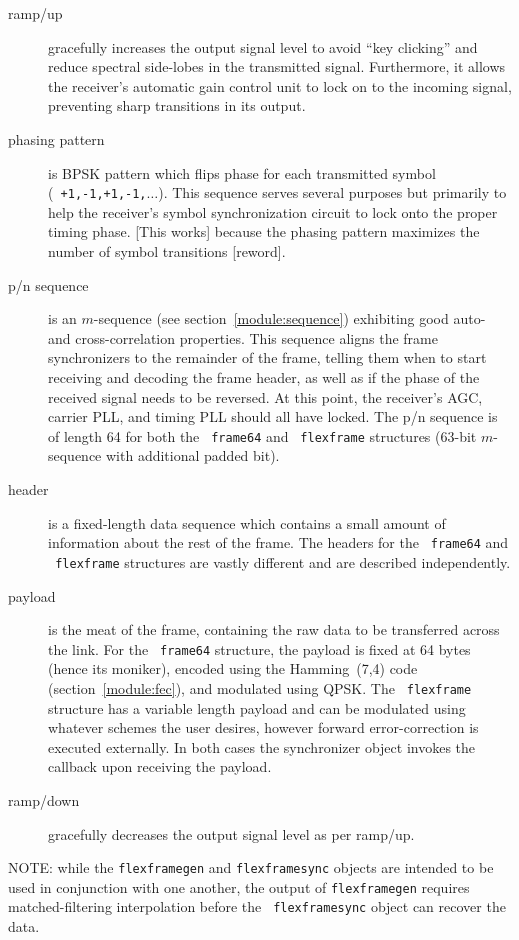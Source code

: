 \begin{description}
\item[{\sf ramp/up}]
    gracefully increases the output signal level to avoid ``key clicking'' and
    reduce spectral side-lobes in the transmitted signal.
    Furthermore, it allows the receiver's automatic gain control unit to
    lock on to the incoming signal, preventing sharp transitions in its
    output.
\item[{\sf phasing pattern}]
    is BPSK pattern which flips phase for each transmitted symbol
    ({\tt~+1,-1,+1,-1,$\ldots$}).
    This sequence serves several purposes but primarily to help the receiver's
    symbol synchronization circuit to lock onto the proper timing phase.
    [This works] because the phasing pattern maximizes the number of symbol
    transitions [reword].
\item[{\sf p/n sequence}]
    is an $m$-sequence (see section~\ref{module:sequence}) exhibiting good
    auto- and cross-correlation properties.
    This sequence aligns the frame synchronizers to the remainder of the
    frame, telling them when to start receiving and decoding the frame header,
    as well as if the phase of the received signal needs to be reversed.
    At this point, the receiver's AGC, carrier PLL, and timing PLL should all
    have locked.
    The p/n sequence is of length 64 for both the {\tt~frame64} and
    {\tt~flexframe} structures (63-bit $m$-sequence with additional padded
    bit).
\item[{\sf header}]
    is a fixed-length data sequence which contains a small amount of
    information about the rest of the frame.
    The headers for the {\tt~frame64} and {\tt~flexframe} structures are
    vastly different and are described independently.
\item[{\sf payload}]
    is the meat of the frame, containing the raw data to be transferred across
    the link.
    For the {\tt~frame64} structure, the payload is fixed at 64 bytes (hence
    its moniker), encoded using the Hamming~(7,4) code
    (section~\ref{module:fec}), and modulated using QPSK.
    The {\tt~flexframe} structure has a variable length payload and can be
    modulated using whatever schemes the user desires, however forward
    error-correction is executed externally.
    In both cases the synchronizer object invokes the callback upon receiving
    the payload.
\item[{\sf ramp/down}]
    gracefully decreases the output signal level as per ramp/up.
\end{description}

NOTE: while the {\tt flexframegen} and {\tt flexframesync} objects are
intended to be used in conjunction with one another, the output of
{\tt flexframegen} requires matched-filtering interpolation before the
{\tt~flexframesync} object can recover the data.


